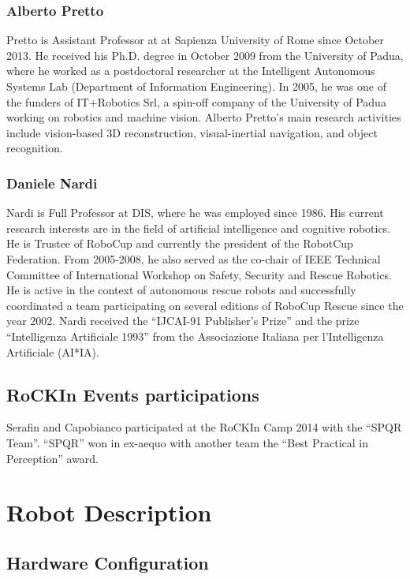 \documentclass[conference]{IEEEtran}
\begin{document}
\subsubsection*{Alberto Pretto}
Pretto is Assistant Professor at at Sapienza University of Rome since October 2013. 
He received his Ph.D. degree in October 2009 from the University of Padua, where he worked as a postdoctoral researcher at the Intelligent Autonomous Systems Lab (Department of Information Engineering). 
In 2005, he was one of the funders of IT+Robotics Srl, a spin-off company of the University of Padua working on robotics and machine vision. 
Alberto Pretto's main research activities include vision-based 3D reconstruction, visual-inertial navigation, and object recognition.
\subsubsection*{Daniele Nardi}
Nardi is Full Professor at DIS, where he was employed since 1986. His current research interests are in the field of artificial intelligence and cognitive robotics. He is Trustee of RoboCup and currently the president of the RobotCup Federation.  From 2005-2008, he also served as the co-chair of IEEE Technical Committee of International Workshop on Safety, Security and Rescue Robotics.  He is active in the context of autonomous rescue robots and successfully coordinated a team participating on several editions of RoboCup Rescue since the year 2002.  
Nardi received the ``IJCAI-91 Publisher's Prize'' and the prize ``Intelligenza Artificiale 1993'' from the Associazione Italiana per l'Intelligenza Artificiale (AI*IA).


\subsection{RoCKIn Events participations}
Serafin and Capobianco participated at the RoCKIn Camp 2014 with the ``SPQR Team''. ``SPQR'' won in ex-aequo with another team the ``Best Practical in Perception'' award.

\section{Robot Description}

\subsection{Hardware Configuration}
\end{document}
